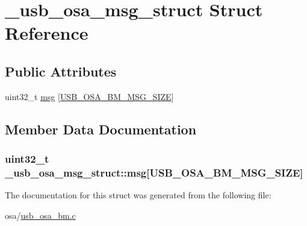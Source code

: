 \hypertarget{struct__usb__osa__msg__struct}{\section{\-\_\-usb\-\_\-osa\-\_\-msg\-\_\-struct Struct Reference}
\label{struct__usb__osa__msg__struct}
}
\subsection*{Public Attributes}
\begin{DoxyCompactItemize}
\item 
uint32\-\_\-t \hyperlink{struct__usb__osa__msg__struct_a91880d9450b8871ab19a065407e0b52e}{msg} \mbox{[}\hyperlink{usb__osa__bm_8c_aebd4f187253120c660884232b56c2741}{U\-S\-B\-\_\-\-O\-S\-A\-\_\-\-B\-M\-\_\-\-M\-S\-G\-\_\-\-S\-I\-Z\-E}\mbox{]}
\end{DoxyCompactItemize}


\subsection{Member Data Documentation}
\hypertarget{struct__usb__osa__msg__struct_a91880d9450b8871ab19a065407e0b52e}{
\subsubsection[{msg}]{\setlength{\rightskip}{0pt plus 5cm}uint32\-\_\-t \-\_\-usb\-\_\-osa\-\_\-msg\-\_\-struct\-::msg\mbox{[}{\bf U\-S\-B\-\_\-\-O\-S\-A\-\_\-\-B\-M\-\_\-\-M\-S\-G\-\_\-\-S\-I\-Z\-E}\mbox{]}}}\label{struct__usb__osa__msg__struct_a91880d9450b8871ab19a065407e0b52e}


The documentation for this struct was generated from the following file\-:\begin{DoxyCompactItemize}
\item 
osa/\hyperlink{usb__osa__bm_8c}{usb\-\_\-osa\-\_\-bm.\-c}\end{DoxyCompactItemize}

